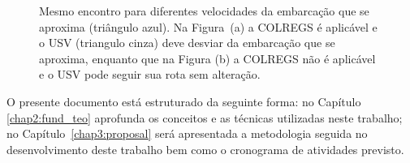 \begin{figure}
    \caption{Mesmo encontro para diferentes velocidades da embarcação que se aproxima (triângulo azul). Na Figura~(a) a COLREGS é aplicável e o USV (triangulo cinza) deve desviar da embarcação que se aproxima, enquanto que na Figura (b) a COLREGS não é aplicável e o USV pode seguir sua rota sem alteração.}
    \label{fig:Kuwata2014_colregsInterpretation}
    \end{figure}
    
    O presente documento está estruturado da seguinte forma: no Capítulo \ref{chap2:fund_teo} aprofunda os conceitos e as técnicas utilizadas neste trabalho; no Capítulo~\ref{chap3:proposal} será apresentada a metodologia seguida no desenvolvimento deste trabalho bem como o cronograma de atividades previsto.
